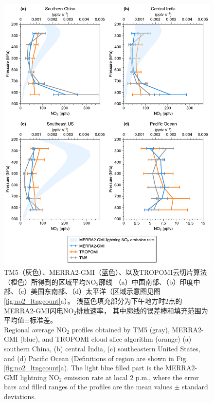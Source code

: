 \begin{figure}[!htbp]
    \centering
    \includegraphics[width=12cm]{./figures/utno2_profile.pdf}
    \caption{
    TM5（灰色）、MERRA2-GMI（蓝色）、以及TROPOMI云切片算法（橙色）所得到的区域平均NO$_2$廓线
    （a）中国南部、（b）印度中部、（c）美国东南部、（d）太平洋（区域示意图见图\ref{fig:no2_ltngcount}a）。
    浅蓝色填充部分为下午地方时2点的MERRA2-GMI闪电NO$_2$排放速率，
    其中廓线的误差棒和填充范围为平均值$\pm$标准差。\\
    Regional average NO$_2$ profiles obtained by TM5 (gray), MERRA2-GMI (blue), and TROPOMI cloud slice algorithm (orange)
    (a) southern China, (b) central India, (c) southeastern United States, and (d) Pacific Ocean
    (Definitions of region are shown in Fig. \ref{fig:no2_ltngcount}a).
    The light blue filled part is the MERRA2-GMI lightning NO$_2$ emission rate at local 2 p.m.,
    where the error bars and filled ranges of the profiles are the mean values $\pm$ standard deviations.
    }
    \label{fig:utno2_profile}
\end{figure}



